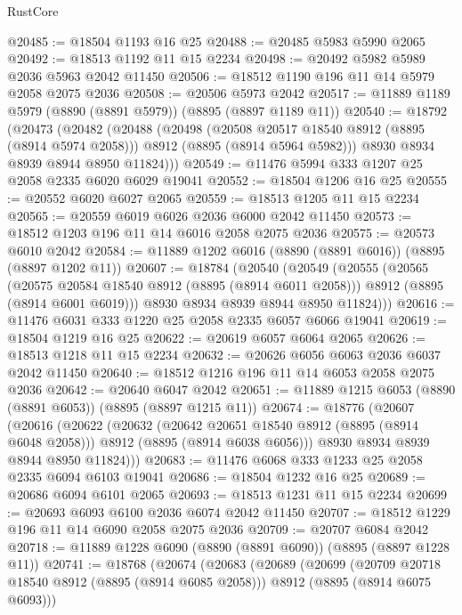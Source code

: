\begin{lexlean}{RustCore}
\begin{coremodule}
@20485 := @18504 @1193 @16 @25
@20488 := @20485 @5983 @5990 @2065
@20492 := @18513 @1192 @11 @15 @2234
@20498 := @20492 @5982 @5989 @2036 @5963 @2042 @11450
@20506 := @18512 @1190 @196 @11 @14 @5979 @2058 @2075 @2036
@20508 := @20506 @5973 @2042
@20517 := @11889 @1189 @5979 (@8890 (@8891 @5979)) (@8895 (@8897 @1189 @11))
@20540 := @18792
    (@20473
      (@20482
        (@20488
          (@20498
            (@20508 @20517 @18540 @8912 (@8895 (@8914 @5974 @2058)))
            @8912
            (@8895 (@8914 @5964 @5982)))
          @8930
          @8934
          @8939
          @8944
          @8950
          @11824)))
@20549 := @11476 @5994 @333 @1207 @25 @2058 @2335 @6020 @6029 @19041
@20552 := @18504 @1206 @16 @25
@20555 := @20552 @6020 @6027 @2065
@20559 := @18513 @1205 @11 @15 @2234
@20565 := @20559 @6019 @6026 @2036 @6000 @2042 @11450
@20573 := @18512 @1203 @196 @11 @14 @6016 @2058 @2075 @2036
@20575 := @20573 @6010 @2042
@20584 := @11889 @1202 @6016 (@8890 (@8891 @6016)) (@8895 (@8897 @1202 @11))
@20607 := @18784
    (@20540
      (@20549
        (@20555
          (@20565
            (@20575 @20584 @18540 @8912 (@8895 (@8914 @6011 @2058)))
            @8912
            (@8895 (@8914 @6001 @6019)))
          @8930
          @8934
          @8939
          @8944
          @8950
          @11824)))
@20616 := @11476 @6031 @333 @1220 @25 @2058 @2335 @6057 @6066 @19041
@20619 := @18504 @1219 @16 @25
@20622 := @20619 @6057 @6064 @2065
@20626 := @18513 @1218 @11 @15 @2234
@20632 := @20626 @6056 @6063 @2036 @6037 @2042 @11450
@20640 := @18512 @1216 @196 @11 @14 @6053 @2058 @2075 @2036
@20642 := @20640 @6047 @2042
@20651 := @11889 @1215 @6053 (@8890 (@8891 @6053)) (@8895 (@8897 @1215 @11))
@20674 := @18776
    (@20607
      (@20616
        (@20622
          (@20632
            (@20642 @20651 @18540 @8912 (@8895 (@8914 @6048 @2058)))
            @8912
            (@8895 (@8914 @6038 @6056)))
          @8930
          @8934
          @8939
          @8944
          @8950
          @11824)))
@20683 := @11476 @6068 @333 @1233 @25 @2058 @2335 @6094 @6103 @19041
@20686 := @18504 @1232 @16 @25
@20689 := @20686 @6094 @6101 @2065
@20693 := @18513 @1231 @11 @15 @2234
@20699 := @20693 @6093 @6100 @2036 @6074 @2042 @11450
@20707 := @18512 @1229 @196 @11 @14 @6090 @2058 @2075 @2036
@20709 := @20707 @6084 @2042
@20718 := @11889 @1228 @6090 (@8890 (@8891 @6090)) (@8895 (@8897 @1228 @11))
@20741 := @18768
    (@20674
      (@20683
        (@20689
          (@20699
            (@20709 @20718 @18540 @8912 (@8895 (@8914 @6085 @2058)))
            @8912
            (@8895 (@8914 @6075 @6093)))

\end{coremodule}
\end{lexlean}
